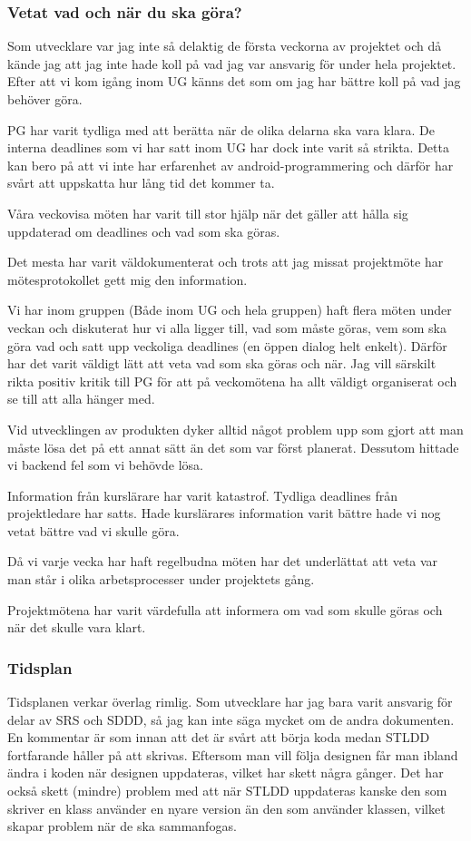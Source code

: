 \documentclass[a4paper]{article}
\begin{document}
\subsubsection{Vetat vad och när du ska göra?}
Som utvecklare var jag inte så delaktig de första veckorna av projektet och då kände jag att jag inte hade koll på vad jag var ansvarig för under hela projektet. Efter att vi kom igång inom UG känns det som om jag har bättre koll på vad jag behöver göra.

PG har varit tydliga med att berätta när de olika delarna ska vara klara. De interna deadlines som vi har satt inom UG har dock inte varit så strikta. Detta kan bero på att vi inte har erfarenhet av android-programmering och därför har svårt att uppskatta hur lång tid det kommer ta.

Våra veckovisa möten har varit till stor hjälp när det gäller att hålla sig uppdaterad om deadlines och vad som ska göras.

Det mesta har varit väldokumenterat och trots att jag missat projektmöte har mötesprotokollet gett mig den information. 

Vi har inom gruppen (Både inom UG och hela gruppen) haft flera möten under veckan och diskuterat hur vi alla ligger till, vad som måste göras, vem som ska göra vad och satt upp veckoliga deadlines (en öppen dialog helt enkelt). Därför har det varit väldigt lätt att veta vad som ska göras och när. Jag vill särskilt rikta positiv kritik till PG för att på veckomötena ha allt väldigt organiserat och se till att alla hänger med.

Vid utvecklingen av produkten dyker alltid något problem upp som gjort att man måste lösa det på ett annat sätt än det som var först planerat. Dessutom hittade vi backend fel som vi behövde lösa. 

Information från kurslärare har varit katastrof. Tydliga deadlines från projektledare har satts. Hade kurslärares information varit bättre hade vi nog vetat bättre vad vi skulle göra.

Då vi varje vecka har haft regelbudna möten har det underlättat att veta var man står i olika arbetsprocesser under projektets gång.

Projektmötena har varit värdefulla att informera om vad som skulle göras och när det skulle vara klart.


\subsubsection{Tidsplan}
Tidsplanen verkar överlag rimlig. Som utvecklare har jag bara varit ansvarig för delar av SRS och SDDD, så jag kan inte säga mycket om de andra dokumenten. En kommentar är som innan att det är svårt att börja koda medan STLDD fortfarande håller på att skrivas. Eftersom man vill följa designen får man ibland ändra i koden när designen uppdateras, vilket har skett några gånger. Det har också skett (mindre) problem med att när STLDD uppdateras kanske den som skriver en klass använder en nyare version än den som använder klassen, vilket skapar problem när de ska sammanfogas.
\end{document}
